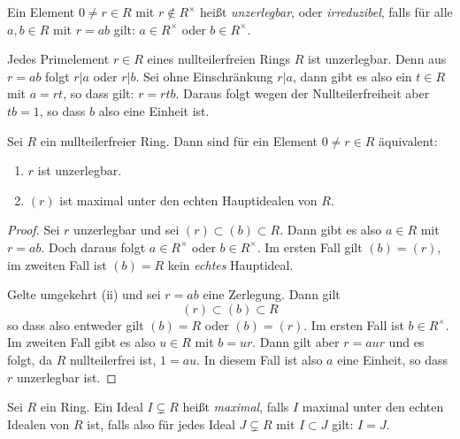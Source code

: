 \documentclass{book}
\begin{document}
\begin{term}
    \label{term:unzerlegbar}
    Ein Element $0 \neq r \in R$ mit $r \notin R^{\times}$ heißt
    \emph{unzerlegbar}, oder \emph{irreduzibel}, falls für alle $a,b \in R$ mit
    $r = ab$ gilt: $a \in R^{\times}$ oder $b \in R^{\times}$.  
\end{term}

\begin{exa}
    \label{exa:primunzer}
    Jedes Primelement $r \in R$ eines nullteilerfreien Rings $R$ ist
    unzerlegbar. Denn aus $r = ab$ folgt $r | a$ oder $r | b$. Sei ohne
    Einschränkung $r|a$, dann gibt es also ein $t \in R$ mit $a = rt$, so dass
    gilt: $r = rtb$. Daraus folgt wegen der Nullteilerfreiheit aber $tb = 1$,
    so dass $b$ also eine Einheit ist. 
\end{exa}

\begin{prop}
    \label{prop:maximalhaupt}
    Sei $R$ ein nullteilerfreier Ring. Dann sind für ein Element $0 \ne r \in R$ äquivalent:
    \begin{enumerate}[label=(\roman *)]
        \item $r$ ist unzerlegbar.
        \item $(r)$ ist maximal unter den echten Hauptidealen von $R$. 
    \end{enumerate}
\end{prop}
\begin{proof}
    Sei $r$ unzerlegbar und sei $(r) \subset (b) \subset R$. Dann gibt es also
    $a \in R$ mit $r = ab$. Doch daraus folgt $a \in R^{\times}$ oder $b \in
    R^{\times}$. Im ersten Fall gilt $(b) = (r)$, im zweiten Fall ist $(b) = R$
    kein \emph{echtes} Hauptideal. 

    Gelte umgekehrt (ii) und sei $r = ab$ eine Zerlegung. Dann gilt
    \[
        (r) \subset (b) \subset R
    \]
    so dass also entweder gilt $(b) = R$ oder $(b) = (r)$. Im ersten Fall ist
    $b \in R^{\times}$. Im zweiten Fall gibt es also $u \in R$ mit $b = ur$. Dann gilt aber
    $r = aur$ und es folgt, da $R$ nullteilerfrei ist, $1 = au$. In diesem Fall
    ist also $a$ eine Einheit, so dass $r$ unzerlegbar ist. 
\end{proof}

\begin{defi}
    \label{defi:maximalideal}
    Sei $R$ ein Ring. Ein Ideal $I \subsetneq R$ heißt \emph{maximal}, falls
    $I$ maximal unter den echten Idealen von $R$ ist, falls also für jedes
    Ideal $J \subsetneq R$ mit $I \subset J$ gilt: $I = J$. 
\end{defi}
\end{document}
